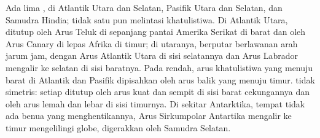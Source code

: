 Ada lima , di Atlantik Utara dan Selatan, Pasifik Utara dan Selatan, dan Samudra Hindia; tidak satu pun melintasi khatulistiwa. Di Atlantik Utara,  ditutup oleh Arus Teluk di sepanjang pantai Amerika Serikat di barat dan oleh Arus Canary di lepas Afrika di timur; di utaranya,  berputar berlawanan arah jarum jam, dengan Arus Atlantik Utara di sisi selatannya dan Arus Labrador mengalir ke selatan di sisi baratnya. Pada  rendah, arus khatulistiwa yang menuju barat di Atlantik dan Pasifik dipisahkan oleh arus balik yang menuju timur.  tidak simetris: setiap  ditutup oleh arus kuat dan sempit di sisi barat cekungannya dan oleh arus lemah dan lebar di sisi timurnya. Di sekitar Antarktika, tempat tidak ada benua yang menghentikannya, Arus Sirkumpolar Antartika mengalir ke timur mengelilingi globe, digerakkan oleh  Samudra Selatan.

